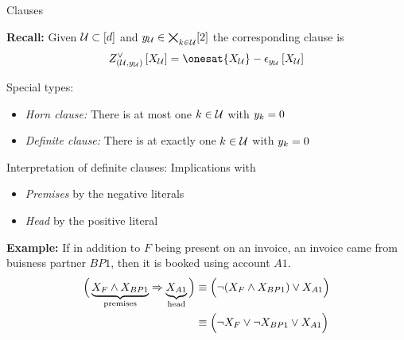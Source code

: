 \documentclass{beamer}
\begin{document}
    \begin{frame}{Clauses}
        \par
        {\bf Recall:} Given $\mathcal{U}\subset[d]$ and $y_{\mathcal{U}}\in\bigtimes_{k\in\mathcal{U}}[2]$ the corresponding clause is
        \begin{align*}
            \clauseofat{\hardparam}{\catvariableof{\hardlegset}}
            = \onesat{\catvariableof{\hardlegset}} - \onehotmapofat{\headindexof{\hardlegset}}{\catvariableof{\hardlegset}}
        \end{align*}

        Special types:
        \begin{itemize}
            \item \emph{Horn clause:} There is at most one $k\in\mathcal{U}$ with $y_{k}=0$
            \item \emph{Definite clause:} There is at exactly one $k\in\mathcal{U}$ with $y_{k}=0$
        \end{itemize}

        Interpretation of definite clauses: Implications with
        \begin{itemize}
            \item \emph{Premises} by the negative literals
            \item \emph{Head} by the positive literal
        \end{itemize}
        \medskip
        {\bf Example:} If in addition to $F$ being present on an invoice, an invoice came from buisness partner $BP1$, then it is booked using account $A1$.
        \begin{align*}
            \Big(\underbrace{X_{F} \land X_{BP1}}_{\text{premises}} \Rightarrow \underbrace{X_{A1}}_{\text{head}}\Big)
            &\equiv
            \Big(\lnot (X_{F} \land X_{BP1}) \lor X_{A1} \Big) \\
            &\equiv
            \Big(\lnot X_{F} \lor \lnot X_{BP1} \lor X_{A1} \Big)
        \end{align*}

    \end{frame}
\end{document}
